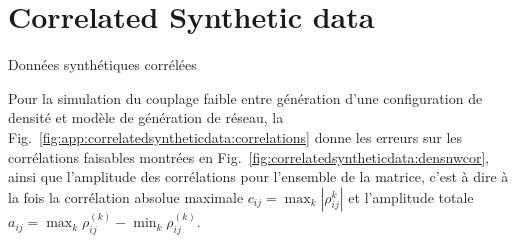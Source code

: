 
\newpage

\section{Correlated Synthetic data}{Données synthétiques corrélées}

\label{app:sec:correlatedsyntheticdata}


Pour la simulation du couplage faible entre génération d'une configuration de densité et modèle de génération de réseau, la Fig.~\ref{fig:app:correlatedsyntheticdata:correlations} donne les erreurs sur les corrélations faisables montrées en Fig.~\ref{fig:correlatedsyntheticdata:densnwcor}, ainsi que l'amplitude des corrélations pour l'ensemble de la matrice, c'est à dire à la fois la corrélation absolue maximale $c_{ij}=\max_k\left| \rho_{ij}^{k} \right|$ et l'amplitude totale $a_{ij}=\max_k{\rho_{ij}^{(k)}}-\min_k{\rho_{ij}^{(k)}}$.


